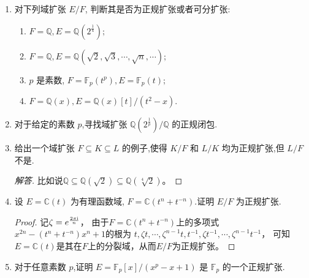 \begin{enumerate}
\item 对下列域扩张 $E/F$, 判断其是否为正规扩张或者可分扩张:
\begin{enumerate}[label=(\arabic*)]
    \item $ F = \mathbb{Q}, E = \mathbb{Q}(2^{\frac{1}{4}}); $
    \item $ F = \mathbb{Q}, E = \mathbb{Q}(\sqrt{2}, \sqrt{3}, \cdots, \sqrt{n}, \cdots); $
    \item $ p $ 是素数, $ F = \mathbb{F}_p(t^p), E = \mathbb{F}_p(t); $
    \item $ F = \mathbb{Q}(x), E = \mathbb{Q}(x)[t]/(t^2 - x). $
\end{enumerate}

\item 对于给定的素数 $ p $,寻找域扩张 $\mathbb{Q}(2^{\frac{1}{p}})/\mathbb{Q}$ 的正规闭包.

\item 给出一个域扩张 $ F \subseteq K \subseteq L $ 的例子,使得 $ K/F $ 和 $ L/K $ 均为正规扩张,但 $ L/F $ 不是.
\begin{proof}[解答]
    比如说$\mathbb{Q}\subseteq\mathbb{Q}(\sqrt{2})\subseteq\mathbb{Q}(\sqrt[4]{2})$。
\end{proof}
\item 设 $ E = \mathbb{C}(t) $ 为有理函数域, $ F = \mathbb{C}(t^n + t^{-n}) $.证明 $ E/F $ 为正规扩张.
\begin{proof}
    记$\zeta=e^{\frac{2\pi{\rm i}}{n}}$，
    由于$F=\mathbb{C}(t^n+t^{-n})$上的多项式$x^{2n}-(t^n+t^{-n})x^n+1$的根为
    $t,\zeta t,\cdots,\zeta^{n-1}t,t^{-1},\zeta t^{-1},\cdots,\zeta^{n-1}t^{-1}$，
    可知$E=\mathbb{C}(t)$是其在$F$上的分裂域，从而$E/F$为正规扩张。
\end{proof}
\item 对于任意素数 $ p $,证明 $ E = \mathbb{F}_p[x]/(x^p - x + 1) $ 是 $ \mathbb{F}_p $ 的一个正规扩张.


\end{enumerate}
